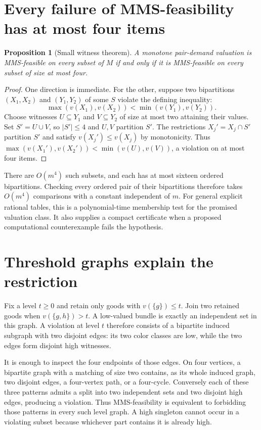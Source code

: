 \documentclass[11pt]{article}
\newtheorem{proposition}{Proposition}
\begin{document}
\section*{Every failure of MMS-feasibility has at most four items}
\begin{proposition}[Small witness theorem]
A monotone pair-demand valuation is MMS-feasible on every subset of $M$ if and only if it is MMS-feasible on every subset of size at most four.
\end{proposition}
\begin{proof}
One direction is immediate. For the other, suppose two bipartitions $(X_1,X_2)$ and $(Y_1,Y_2)$ of some $S$ violate the defining inequality:
\[
 \max(v(X_1),v(X_2))<\min(v(Y_1),v(Y_2)).
\]
Choose witnesses $U\subseteq Y_1$ and $V\subseteq Y_2$ of size at most two attaining their values. Set $S'=U\cup V$, so $|S'|\leq4$ and $U,V$ partition $S'$. The restrictions $X_j'=X_j\cap S'$ partition $S'$ and satisfy $v(X_j')\leq v(X_j)$ by monotonicity. Thus
$\max(v(X_1'),v(X_2'))<\min(v(U),v(V))$,
a violation on at most four items.
\end{proof}

There are $O(m^4)$ such subsets, and each has at most sixteen ordered bipartitions. Checking every ordered pair of their bipartitions therefore takes $O(m^4)$ comparisons with a constant independent of $m$. For general explicit rational tables, this is a polynomial-time membership test for the promised valuation class. It also supplies a compact certificate when a proposed computational counterexample fails the hypothesis.

\section*{Threshold graphs explain the restriction}
Fix a level $t\geq0$ and retain only goods with $v(\{g\})\leq t$. Join two retained goods when $v(\{g,h\})>t$. A low-valued bundle is exactly an independent set in this graph. A violation at level $t$ therefore consists of a bipartite induced subgraph with two disjoint edges: its two color classes are low, while the two edges form disjoint high witnesses.

It is enough to inspect the four endpoints of those edges. On four vertices, a bipartite graph with a matching of size two contains, as its whole induced graph, two disjoint edges, a four-vertex path, or a four-cycle. Conversely each of these three patterns admits a split into two independent sets and two disjoint high edges, producing a violation. Thus MMS-feasibility is equivalent to forbidding those patterns in every such level graph. A high singleton cannot occur in a violating subset because whichever part contains it is already high.
\end{document}

